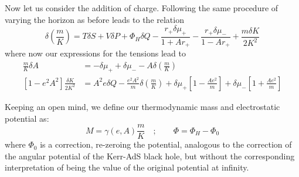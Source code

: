 \documentclass[
twoside,openright,frontopenright]{dmathesis}
\begin{document}
Now let us consider the addition of charge. Following the same procedure of
varying the horizon as before leads to the relation
\begin{equation}
\delta (\frac{m}{K}) = T \delta S + V \delta P + \Phi_H\delta Q
- \frac{r_+\delta \mu_+}{1+Ar_+}- \frac{r_+\delta \mu_-}{1-Ar_+}
+ \frac{m\delta K}{2K^2}
\end{equation}
where now our expressions for the tensions lead to
\begin{equation}
\begin{aligned}
\frac{m}{K} \delta A &= -\delta \mu_+ + \delta \mu_- 
- A \delta \left (\frac{m}{K} \right) \\
[1 - e^2 A^2 ] \frac{\delta K}{2K^2} &= A^2 e \delta Q
- \frac{e^2 A^2}{m} \delta \left ( \frac{m}{K} \right )
+ \delta \mu_+ \left [ 1 - \frac{Ae^2}{m} \right ] + \delta \mu_- \left [ 1 + \frac{Ae^2}{m} \right ]
\end{aligned}
\label{deltaKcharge}
\end{equation}

Keeping an open mind, we define our thermodynamic mass and electrostatic
potential as:
\begin{equation}
M = \gamma(e,A) \frac{m}{K} \quad ; \qquad
\Phi = \Phi_H - \Phi_0
\end{equation}
where $\Phi_0$ is a correction, re-zeroing the potential, analogous to the
correction of the angular potential of the Kerr-AdS black hole, but without the
corresponding interpretation of being the value of the original potential at
infinity.
\end{document}
